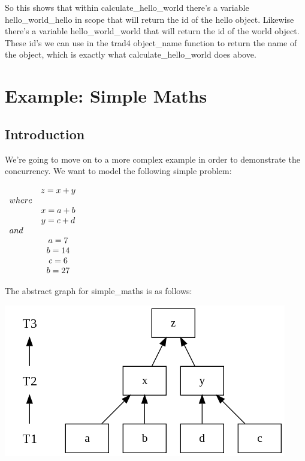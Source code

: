 \documentclass{report}
\begin{document}
So this shows that within calculate_hello_world there's a variable hello_world_hello in scope that will return the id of the hello object. Likewise there's a variable hello_world_world that will return the id of the world object. These id's we can use in the trad4 object_name function to return the name of the object, which is exactly what calculate_hello_world does above.

\chapter{Example: Simple Maths}

\section{Introduction}

We're going to move on to a more complex example in order to demonstrate the concurrency. We want to model the following simple problem:

\begin{math}
  \begin{array}{ l c }
        & z = x + y   \\
        where         \\
        & x = a + b   \\
        & y = c + d   \\
        and           \\
        & a = 7       \\
        & b = 14      \\
        & c = 6       \\
        & b = 27      \\
  \end{array} 
\end{math}

The abstract graph for simple_maths is as follows:

\includegraphics[scale=0.5]{simplemathsabstract.png}
\end{document}
